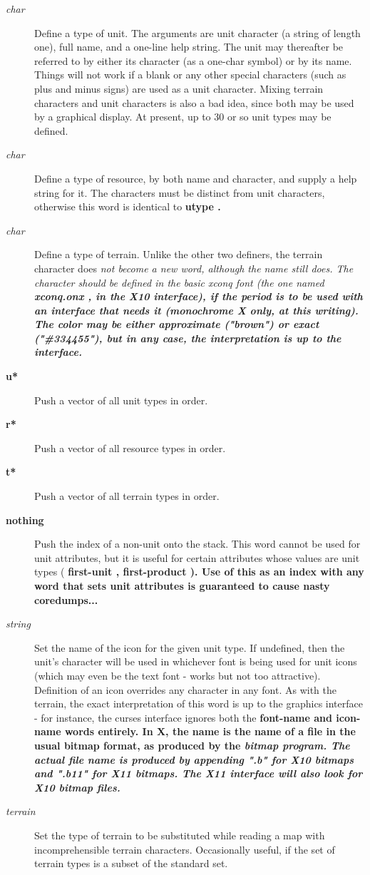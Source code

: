 \begin{description}
\item[{%
\it char}]
Define a type of unit.
The arguments are unit character (a string of length one),
full name, and a
one-line help string.  The unit may thereafter be referred to by either
its character (as a one-char symbol) or by its name.
Things will not work if a blank or any other special characters (such as plus
and minus signs) are used as a unit character.  Mixing terrain characters
and unit characters is also a bad idea, since both may be used by a
graphical display.
At present, up to 30 or so unit types may be defined.
\item[{%
\it char}]
Define a type of resource, by both name and character, and supply a help
string for it.  The characters must be distinct from unit characters,
otherwise this word is identical to %
\bf utype\rm%
.
\item[{%
\it char}]
Define a type of terrain.  Unlike the other two definers, the terrain
character does %
\it not \rm%
become a new word, although the name still does.
The character should be defined in the basic %
\it xconq \rm%
font (the one named
%
\bf xconq.onx\rm%
, in the X10 interface), if the
period is to be used with an interface that needs it (monochrome X only,
at this writing).  The color may be either approximate ("brown") or exact
("\#334455"), but in any case, the interpretation is up to the interface.
\item[{%
\bf u*%
\rm }]
Push a vector of all unit types in order.
\item[{%
\bf r*%
\rm }]
Push a vector of all resource types in order.
\item[{%
\bf t*%
\rm }]
Push a vector of all terrain types in order.
\item[{%
\bf nothing%
\rm }]
Push the index of a non-unit onto the stack.  This word cannot be used for
unit attributes, but it is useful for certain attributes whose values are
unit types (%
\bf first-unit\rm%
, %
\bf first-product\rm%
).
Use of this as an index with any word that sets unit attributes is
guaranteed to cause nasty coredumps...
\item[{%
\it string}]
Set the name of the icon for the given unit type.  If undefined, then
the unit's character will be used in whichever font is being used for
unit icons (which may even be the text font - works but not too attractive).
Definition of an icon overrides any character in any font.
As with the terrain, the exact interpretation of this word is up to
the graphics interface - for instance, the curses interface ignores
both the %
\bf font-name \rm%
and %
\bf icon-name \rm%
words entirely.
In X, the name is the name of a file in the usual bitmap format, as
produced by the %
\it bitmap \rm%
program.  The actual file name is produced
by appending %
\bf ".b" \rm%
for X10 bitmaps and %
\bf ".b11" \rm%
for X11 bitmaps.  The X11 interface will also look for X10 bitmap files.
\item[{%
\it terrain}]
Set the type of terrain to be substituted while reading a map
with incomprehensible terrain characters.  Occasionally useful,
if the set of terrain types is a subset of the standard set.
\end{description}\par\noindent
